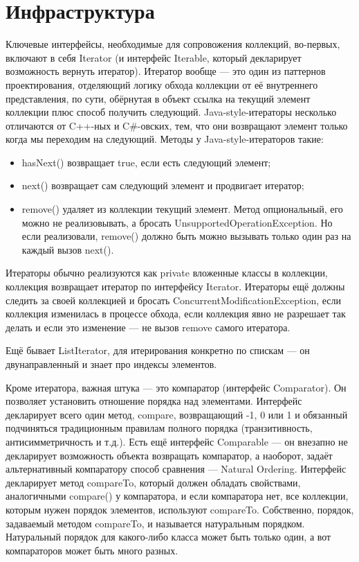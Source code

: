 \documentclass[a5paper]{article}
\begin{document}
\section{Инфраструктура}

Ключевые интерфейсы, необходимые для сопровожения коллекций, во-первых, включают в себя Iterator (и интерфейс Iterable, который декларирует возможность вернуть итератор). Итератор вообще --- это один из паттернов проектирования, отделяющий логику обхода коллекции от её внутреннего представления, по сути, обёрнутая в объект ссылка на текущий элемент коллекции плюс способ получить следующий. Java-style-итераторы несколько отличаются от C++-ных и C\#-овских, тем, что они возвращают элемент только когда мы переходим на следующий. Методы у Java-style-итераторов такие:

\begin{itemize}
	\item hasNext() возвращает true, если есть следующий элемент;
	\item next() возвращает сам следующий элемент и продвигает итератор;
	\item remove() удаляет из коллекции текущий элемент. Метод опциональный, его можно не реализовывать, а бросать UnsupportedOperationException. Но если реализовали, remove() должно быть можно вызывать только один раз на каждый вызов next().
\end{itemize}

Итераторы обычно реализуются как private вложенные классы в коллекции, коллекция возвращает итератор по интерфейсу Iterator. Итераторы ещё должны следить за своей коллекцией и бросать ConcurrentModificationException, если коллекция изменилась в процессе обхода, если коллекция явно не разрешает так делать и если это изменение --- не вызов remove самого итератора.

Ещё бывает ListIterator, для итерирования конкретно по спискам --- он двунаправленный и знает про индексы элементов.

Кроме итератора, важная штука --- это компаратор (интерфейс Comparator). Он позволяет установить отношение порядка над элементами. Интерфейс декларирует всего один метод, compare, возвращающий -1, 0 или 1 и обязанный подчиняться традиционным правилам полного порядка (транзитивность, антисимметричность и т.д.). Есть ещё интерфейс Comparable --- он внезапно не декларирует возможность объекта возвращать компаратор, а наоборот, задаёт альтернативный компаратору способ сравнения --- Natural Ordering. Интерфейс декларирует метод compareTo, который должен обладать свойствами, аналогичными compare() у компаратора, и если компаратора нет, все коллекции, которым нужен порядок элементов, используют compareTo. Собственно, порядок, задаваемый методом compareTo, и называется натуральным порядком. Натуральный порядок для какого-либо класса может быть только один, а вот компараторов может быть много разных.
\end{document}
